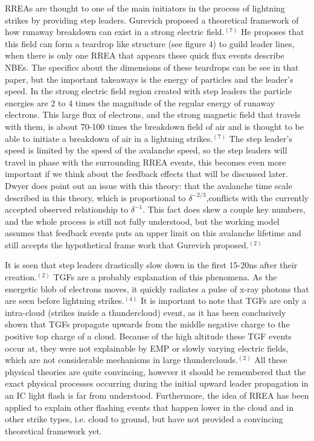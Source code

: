 \documentclass[11pt]{article}
\begin{document}
    RREAs are thought to one of the main initiators in the process of lightning strikes by providing step leaders. Gurevich proposed a theoretical framework of how runaway breakdown can exist in a strong electric field.$^{(7)}$  He proposes that this field can form a teardrop like structure (see figure 4) to guild leader lines, when there is only one RREA that appears these quick flux events describe NBEs. The specifics about the dimensions of these teardrops can be see in that paper, but the important takeaways is the energy of particles and the leader's speed. In the strong electric field region created with step leaders the particle energies are 2 to 4 times the magnitude of the regular energy of runaway electrons. This large flux of electrons, and the strong magnetic field that travels with them, is about 70-100 times the breakdown field of air and is thought to be able to initiate a breakdown of air in a lightning strikes.${^{(7)}}$ The step leader's speed is limited by the speed of the avalanche speed, so the step leaders will travel in phase with the surrounding RREA events, this becomes even more important if we think about the feedback effects that will be discussed later. Dwyer does point out an issue with this theory: that the avalanche time scale described in this theory, which is proportional to $\delta^{-2/3}$,conflicts with the currently accepted observed relationship to $\delta^{-1}$. This fact does skew a couple key numbers, and the whole process is still not fully understood, but the working model assumes that feedback events puts an upper limit on this avalanche lifetime and still accepts the hypothetical frame work that Gurevich proposed.$^{(2)}$
    
    It is seen that step leaders drastically slow down in the first 15-20ns after their creation.$^{(2)}$ TGFs are a probably explanation of this phenomena. As the energetic blob of electrons moves, it quickly radiates a pulse of x-ray photons that are seen before lightning strikes.$^{(4)}$ It is important to note that TGFs are only a intra-cloud (strikes inside a thundercloud) event, as it has been conclusively shown that TGFs propagate upwards from the middle negative charge to the positive top charge of a cloud. Because of the high altitude these TGF events occur at, they were not explainable by EMP or slowly varying electric fields, which are not considerable mechanisms in large thunderclouds.$^{(2)}$ All these physical theories are quite convincing, however it should be remembered that the exact physical processes occurring during the initial upward leader propagation in an IC light flash is far from understood. Furthermore, the idea of RREA has been applied to explain other flashing events that happen lower in the cloud and in other strike types, i.e. cloud to ground, but have not provided a convincing theoretical framework yet.
    \newline
\end{document}

